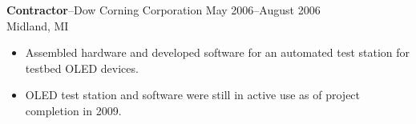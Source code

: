 \documentclass[10pt]{article}
\newcommand{\jobitem}[4]{
    \vspace{4pt}

    \textbf{#1}--#2 \hfill #3\\ #4

    \vspace{-8pt}
}
\begin{document}


\jobitem{Contractor}{Dow Corning Corporation}{May 2006--August 2006}{Midland, MI}

\begin{itemize}\setlength{\itemsep}{0cm}
  \setlength{\parskip}{0cm}
\item Assembled hardware and developed software for an automated test station for testbed OLED devices. 
\item OLED test station and software were still in active use as of project completion in 2009.
\end{itemize}
%
\end{document}
